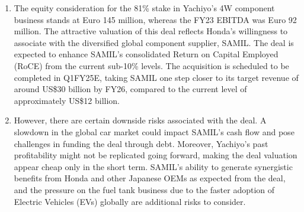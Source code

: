 \begin{enumerate}
\item The equity consideration for the 81\% stake in Yachiyo's 4W component business stands at Euro 145 million, whereas the FY23 EBITDA was Euro 92 million. The attractive valuation of this deal reflects Honda's willingness to associate with the diversified global component supplier, SAMIL. The deal is expected to enhance SAMIL's consolidated Return on Capital Employed (RoCE) from the current sub-10\% levels. The acquisition is scheduled to be completed in Q1FY25E, taking SAMIL one step closer to its target revenue of around US\$30 billion by FY26, compared to the current level of approximately US\$12 billion.

\item However, there are certain downside risks associated with the deal. A slowdown in the global car market could impact SAMIL's cash flow and pose challenges in funding the deal through debt. Moreover, Yachiyo's past profitability might not be replicated going forward, making the deal valuation appear cheap only in the short term. SAMIL's ability to generate synergistic benefits from Honda and other Japanese OEMs as expected from the deal, and the pressure on the fuel tank business due to the faster adoption of Electric Vehicles (EVs) globally are additional risks to consider.

\end{enumerate}

